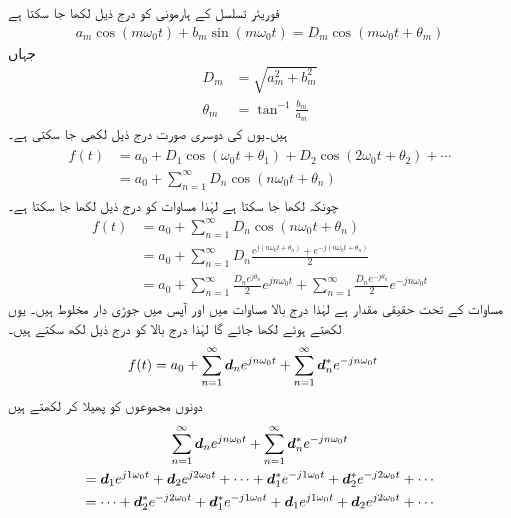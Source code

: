 فوریئر تسلسل کے  ہارمونی کو درج ذیل لکھا جا سکتا ہے
\begin{align*}
a_m\cos(m\omega_0 t)+b_m\sin(m\omega_0 t)=D_m\cos(m\omega_0 t+\theta_m)
\end{align*} 
جہاں
\begin{align}\label{مساوات_فوریئر_رداس_زاویہ}
D_m&=\sqrt{a_m^2+b_m^2}\\
\theta_m&=\tan^{-1}\frac{b_m}{a_m}
\end{align}
 ہیں۔یوں   کی دوسری صورت درج ذیل لکھی جا سکتی ہے۔
\begin{gather}
\begin{aligned}\label{مساوات_فوریئر_تسلسل_صورت_ب}
f(t)&=a_0+D_1\cos(\omega_0 t+\theta_1)+D_2\cos(2\omega_0 t+\theta_2)+\cdots\\
&=a_0+\sum_{n=1}^{\infty} D_n \cos(n\omega_0 t +\theta_n)
\end{aligned}
\end{gather}
چونکہ  لکھا جا سکتا ہے لہٰذا مساوات  کو درج ذیل لکھا جا سکتا ہے۔
\begin{align*}
f(t)&=a_0+\sum_{n=1}^{\infty} D_n \cos(n\omega_0 t +\theta_n)\\
&=a_0+\sum_{n=1}^{\infty} D_n \frac{e^{j(n\omega_0 t+\theta_n)}+e^{-j(n\omega_0 t+\theta_n)}}{2}\\
&=a_0+\sum_{n=1}^{\infty} \frac{D_n e^{j\theta_n}}{2} e^{jn\omega_0 t}+\sum_{n=1}^{\infty} \frac{D_n e^{-j\theta_n}}{2}e^{-jn\omega_0 t}
\end{align*}
مساوات  کے تحت  حقیقی مقدار ہے لہٰذا درج بالا مساوات میں  اور
  آپس میں جوڑی دار مخلوط ہیں۔ یوں  لکھتے ہوئے
  لکھا جائے گا لہٰذا درج بالا کو درج ذیل لکھ سکتے ہیں۔
\begin{align}\label{مساوات_فوریئر_تسلسل_پ}
f(t)&=a_0+\sum_{n=1}^{\infty} {{\boldsymbol{d}}}_n e^{jn\omega_0 t}+\sum_{n=1}^{\infty} {{\boldsymbol{d}}}^*_n e^{-jn\omega_0 t}
\end{align}
دونوں مجموعوں کو پھیلا کر لکھتے ہیں
\begin{multline*}
\sum_{n=1}^{\infty} {{\boldsymbol{d}}}_n e^{jn\omega_0 t}+\sum_{n=1}^{\infty} {{\boldsymbol{d}}}^*_n e^{-jn\omega_0 t}\\
={{\boldsymbol{d}}}_1 e^{j1\omega_0 t}+{{\boldsymbol{d}}}_2 e^{j2\omega_0 t}+\cdots +{{\boldsymbol{d}}}^*_1 e^{-j1\omega_0 t}+{{\boldsymbol{d}}}^*_2 e^{-j2\omega_0 t}+\cdots \\
=\cdots+{{\boldsymbol{d}}}^*_2 e^{-j2\omega_0 t}+{{\boldsymbol{d}}}^*_1 e^{-j1\omega_0 t}+{{\boldsymbol{d}}}_1 e^{j1\omega_0 t}+{{\boldsymbol{d}}}_2 e^{j2\omega_0 t}+\cdots
\end{multline*}
